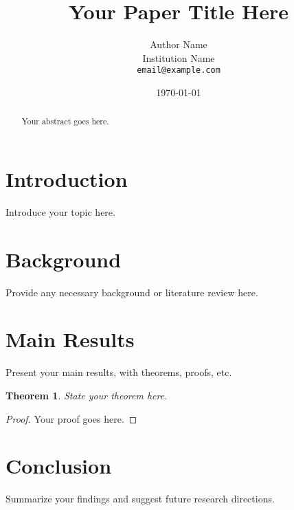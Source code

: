 \documentclass[12pt]{article}
\title{Your Paper Title Here}
\author{Author Name\\
\small Institution Name\\
\small \texttt{email@example.com}
}
\date{\today}
\theoremstyle{definition}
\theoremstyle{remark}
\theoremstyle{plain}
\newtheorem{theorem}{Theorem}[section]
\begin{document}
\maketitle

\begin{abstract}
Your abstract goes here.
\end{abstract}

\section{Introduction}
Introduce your topic here.

\section{Background}
Provide any necessary background or literature review here.

\section{Main Results}
Present your main results, with theorems, proofs, etc.

\begin{theorem}
State your theorem here.
\end{theorem}

\begin{proof}
Your proof goes here.
\end{proof}

\section{Conclusion}
Summarize your findings and suggest future research directions.



\end{document}

